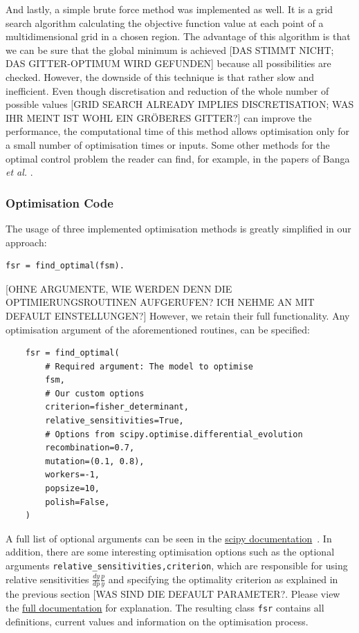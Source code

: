 \documentclass[10pt,A4paper]{article}
\newcommand{\etal}{{\textit{et al. }}}
\begin{document}
And lastly, a simple brute force method was implemented as well.
It is a grid search algorithm calculating the objective function value at each point of a multidimensional grid in a chosen region.
The advantage of this algorithm is that we can be sure that the global minimum is achieved [DAS STIMMT NICHT; DAS GITTER-OPTIMUM WIRD GEFUNDEN] because all possibilities are checked.
However, the downside of this technique is that rather slow and inefficient.
Even though discretisation and reduction of the whole number of possible values [GRID SEARCH ALREADY IMPLIES DISCRETISATION; WAS IHR MEINT IST WOHL EIN GRÖBERES GITTER?] can improve the performance, the computational time of this method allows optimisation only for a small number of optimisation times or inputs.
Some other methods for the optimal control problem the reader can find, for example, in the papers of Banga \etal \cite{BANGA2005407, bangaImprovingFoodProcessing2003}.
%
\subsubsection*{Optimisation Code}
The usage of three implemented optimisation methods is greatly simplified in our approach: 
\begin{verbatim}
fsr = find_optimal(fsm).
\end{verbatim}
[OHNE ARGUMENTE, WIE WERDEN DENN DIE OPTIMIERUNGSROUTINEN AUFGERUFEN? ICH NEHME AN MIT DEFAULT EINSTELLUNGEN?]
However, we retain their full functionality. Any optimisation argument of the aforementioned routines, can be specified: 
\begin{verbatim}
    fsr = find_optimal(
        # Required argument: The model to optimise
        fsm,
        # Our custom options
        criterion=fisher_determinant,
        relative_sensitivities=True,
        # Options from scipy.optimise.differential_evolution
        recombination=0.7,
        mutation=(0.1, 0.8),
        workers=-1,
        popsize=10,
        polish=False,
    )
\end{verbatim}
A full list of optional arguments can be seen in the \href{https://docs.scipy.org/doc/scipy/reference/optimize.html#global-optimization}{scipy documentation}~\cite{virtanenSciPyFundamentalAlgorithms2020}.
In addition, there are some interesting optimisation options such as the optional arguments \texttt{relative_sensitivities,criterion}, which are responsible for using relative sensitivities $\tfrac{dy}{dp}\tfrac{p}{y}$ and specifying the optimality criterion as explained in the previous section [WAS SIND DIE DEFAULT PARAMETER?.
Please view the \href{https://spatial-systems-biology-freiburg.github.io/FisInMa/}{full documentation} for explanation.
The resulting class \texttt{fsr} contains all definitions, current values and information on the optimisation process.
%
\end{document}
